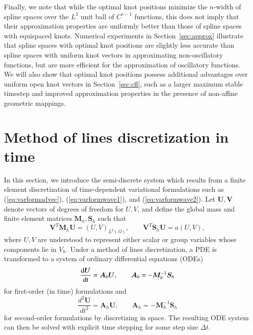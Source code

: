 \documentclass[preprint,10pt]{elsarticle}
\newcommand{\td}[2]{\frac{{\rm d}#1}{{\rm d}{\rm #2}}}
\newcommand{\LRp}[1]{\left( #1 \right)}
\newcommand{\reviewerTwo}[1]{#1}
\begin{document}
Finally, we note that while the optimal knot positions minimize the $n$-width of spline spaces over the $L^2$ unit ball of $C^{r-1}$ functions, this does not imply that their approximation properties are uniformly better than those of spline spaces with equispaced knots.  Numerical experiments in Section~\ref{sec:approx} illustrate that spline spaces with optimal knot positions are slightly less accurate than spline spaces with uniform knot vectors in approximating non-oscillatory functions, but are more efficient for the approximation of oscillatory functions.  We will also show that optimal knot positions possess additional advantages over uniform open knot vectors in Section~\ref{sec:cfl}, such as a larger maximum stable timestep and improved approximation properties in the presence of non-affine geometric mappings.   

\section{Method of lines discretization in time}
\label{sec:mol}

\reviewerTwo{In this section, we introduce the semi-discrete system which results from a finite element discretization of time-dependent variational formulations such as (\ref{eq:varformadvec}), (\ref{eq:varformwave1}), and (\ref{eq:varformwave2}).}  Let $\bm{U},\bm{V}$ denote vectors of degrees of freedom for $U,V$, and define the global mass and finite element matrices $\bm{M}_h, \bm{S}_h$ such that 
\[
\bm{V}^T\bm{M}_h\bm{U} = \LRp{ U,V}_{L^2\LRp{\Omega}}, \qquad \bm{V}^T\bm{S}_h\bm{U} = a(U,V),
\]
where $U,V$ are understood to represent either scalar or group variables whose components lie in $V_h$.  
Under a method of lines discretization, a PDE is transformed to a system of ordinary differential equations (ODEs) 
\begin{equation}
\td{\bm{U}}{t} = \bm{A}_h \bm{U}, \qquad \bm{A}_h = -\bm{M}_h^{-1}\bm{S}_h
\label{eq:mol}
\end{equation}
\reviewerTwo{for first-order (in time) formulations and
\begin{equation}
\frac{d^2\bm{U}}{dt^2} = \bm{A}_h \bm{U}, \qquad \bm{A}_h = -\bm{M}_h^{-1}\bm{S}_h
\label{eq:mol_second}
\end{equation} for second-order formulations} by discretizing in space.  The resulting ODE system can then be solved with explicit time stepping for some step size $\Delta t$.  
\end{document}
